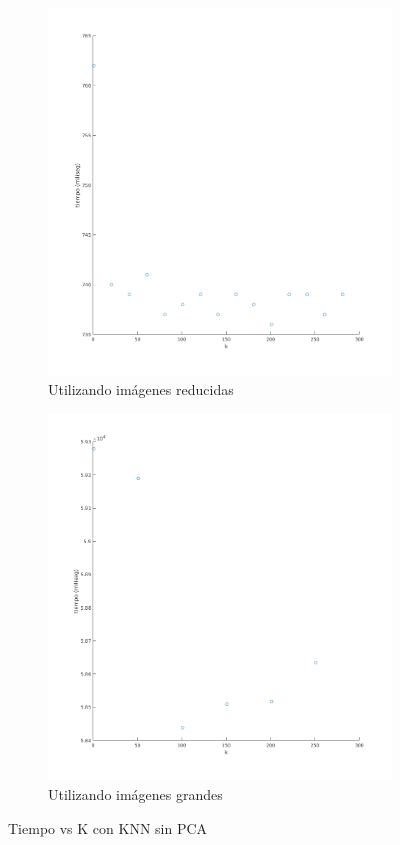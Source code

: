 \begin{figure}[H]
\begin{subfigure}[h]{0.62\linewidth}
\includegraphics[width=\linewidth]{img/k_knn_tiempo.png}
\caption{Utilizando imágenes reducidas}
\end{subfigure}
\hfill
\begin{subfigure}[h]{0.62\linewidth}
\includegraphics[width=\linewidth]{img/big_k_knn_tiempo.png}
\caption{Utilizando imágenes grandes}
\end{subfigure}%
\caption{Tiempo vs K con KNN sin PCA}
\end{figure}


